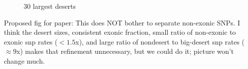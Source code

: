 \documentclass{article}\usepackage[]{graphicx}\usepackage[]{color}
\begin{document}
\begin{figure}
  \begin{center}
    \vspace*{-30pt}%
  \end{center}
  \caption{30 largest deserts}
  \label{fig:excel}
\end{figure}

Proposed fig for paper:  This does NOT bother to separate non-exonic SNPs.  I think the desert sizes, consistent exonic fraction, small ratio of non-exonic to exonic snp rates ($<1.5$x), and large ratio of nondesert to big-desert snp rates ($\approx 9$x) makes that refinement unnecessary, but we could do it; picture won't change much.
\end{document}
